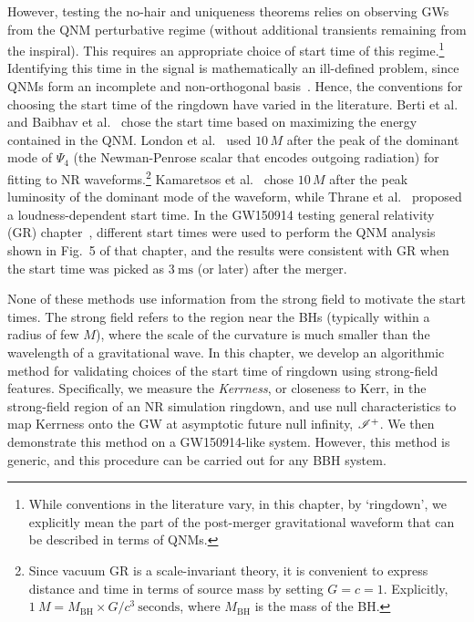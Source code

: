 However, testing the no-hair and uniqueness theorems relies on observing GWs from the QNM perturbative regime (without additional transients remaining from the inspiral). This requires an appropriate choice of start time of this regime.\footnote{While conventions in the literature vary, in this chapter, by `ringdown', we explicitly mean the part of the post-merger gravitational waveform that can be described in terms of QNMs.} Identifying this time in the signal is mathematically an ill-defined problem, since QNMs form an incomplete and non-orthogonal basis~\cite{QNMincomplete,QNMnonorthogonal}. Hence, the conventions for choosing the start time of the ringdown have varied in the literature. Berti et al.~\cite{EMOP} and Baibhav et al.~\cite{Baibhav:2017jhs} chose the start time based on maximizing the energy contained in the QNM. London et al.~\cite{London} used $10\,M$ after the peak of the dominant mode of $\Psi_4$ (the Newman-Penrose scalar that encodes outgoing radiation) for fitting to NR waveforms.\footnote{ \label{note1} Since vacuum GR is a scale-invariant theory, it is convenient to express distance and time in terms of source mass by setting $G=c=1$. Explicitly, $ 1~M = M_{\mathrm{BH}} \times G/c^{3} ~\mathrm{seconds}$, where $M_{\mathrm{BH}}$ is the mass of the BH.} Kamaretsos et al.~\cite{2012PhRvL.109n1102K} chose $10\,M$ after the peak luminosity of the dominant mode of the waveform, while Thrane et al.~\cite{Thrane} proposed a loudness-dependent start time. In the  GW150914 testing general relativity (GR) chapter~\cite{TheLIGOScientific:2016src}, different start times were used to perform the QNM analysis shown in Fig.~5 of that chapter, and the results were consistent with GR when the start time was picked as $3~\mathrm{ms}$ (or later) after the merger.


None of these methods use information from the strong field to motivate the start times. The strong field refers to the region near the BHs (typically within a radius of few $M$), where the scale of the curvature is much smaller than the wavelength of a gravitational wave. In this chapter, we develop an algorithmic method for validating choices of the start time of ringdown using strong-field features. Specifically, we measure the \textit{Kerrness}, or closeness to Kerr, in the strong-field region of an NR simulation ringdown, and use null characteristics to map Kerrness onto the GW at asymptotic future null infinity, $\mathscr{I^+}$. We then demonstrate this method on a GW150914-like system. However, this method is generic, and this procedure can be carried out for any BBH system.

